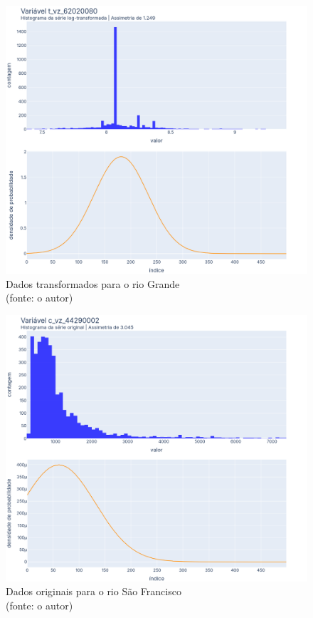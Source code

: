 \begin{figure}[!h]
	\centering
	\includegraphics[scale=0.8]{Figuras/rio_grande/rio_grande_depois_log.png}
	\caption{Dados transformados para o rio Grande\\(fonte: o autor)}
	\label{fig:rio_grande_depois_log}
\end{figure}

\begin{figure}[!h]
	\centering
	\includegraphics[scale=0.8]{Figuras/rio_sao_francisco/rio_sao_francisco_antes_log.png}
	\caption{Dados originais para o rio São Francisco\\(fonte: o autor)}
	\label{fig:rio_sao_francisco_antes_log}
\end{figure}

